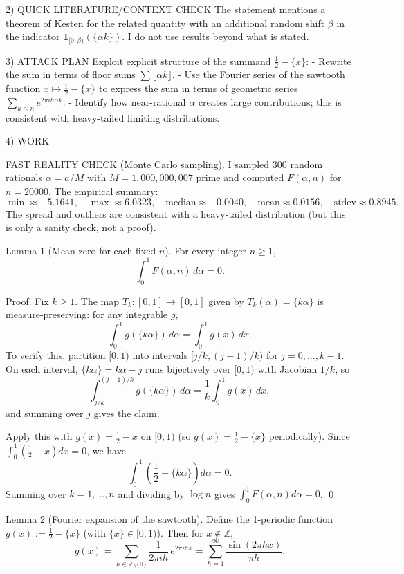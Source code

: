 2) QUICK LITERATURE/CONTEXT CHECK
The statement mentions a theorem of Kesten for the related quantity with an additional random shift $\beta$ in the indicator $\mathbf 1_{[0,\beta)}(\{\alpha k\})$.  I do not use results beyond what is stated.

3) ATTACK PLAN
Exploit explicit structure of the summand $\frac12-\{x\}$:
- Rewrite the sum in terms of floor sums $\sum\lfloor \alpha k\rfloor$.
- Use the Fourier series of the sawtooth function $x\mapsto \frac12-\{x\}$ to express the sum in terms of geometric series $\sum_{k\le n} e^{2\pi i h\alpha k}$.
- Identify how near-rational $\alpha$ creates large contributions; this is consistent with heavy-tailed limiting distributions.

4) WORK

FAST REALITY CHECK (Monte Carlo sampling).
I sampled $300$ random rationals $\alpha=a/M$ with $M=1{,}000{,}000{,}007$ prime and computed $F(\alpha,n)$ for $n=20000$.
The empirical summary:
\[
\min\approx -5.1641,\quad \max\approx 6.0323,\quad \text{median}\approx -0.0040,\quad \text{mean}\approx 0.0156,\quad \text{stdev}\approx 0.8945.
\]
The spread and outliers are consistent with a heavy-tailed distribution (but this is only a sanity check, not a proof).

Lemma 1 (Mean zero for each fixed $n$).
For every integer $n\ge 1$,
\[
\int_0^1 F(\alpha,n)\,d\alpha = 0.
\]

Proof.
Fix $k\ge 1$.  The map $T_k:[0,1]\to[0,1]$ given by $T_k(\alpha)=\{k\alpha\}$ is measure-preserving: for any integrable $g$,
\[
\int_0^1 g(\{k\alpha\})\,d\alpha = \int_0^1 g(x)\,dx.
\]
To verify this, partition $[0,1)$ into intervals $[j/k,(j+1)/k)$ for $j=0,\dots,k-1$.  On each interval, $\{k\alpha\}=k\alpha-j$ runs bijectively over $[0,1)$ with Jacobian $1/k$, so
\[
\int_{j/k}^{(j+1)/k} g(\{k\alpha\})\,d\alpha = \frac{1}{k}\int_0^1 g(x)\,dx,
\]
and summing over $j$ gives the claim.

Apply this with $g(x)=\frac12-x$ on $[0,1)$ (so $g(x)=\frac12-\{x\}$ periodically).  Since $\int_0^1 (\frac12-x)dx=0$, we have
\[
\int_0^1 \left(\frac12-\{k\alpha\}\right)d\alpha = 0.
\]
Summing over $k=1,\dots,n$ and dividing by $\log n$ gives $\int_0^1 F(\alpha,n)d\alpha=0$. \qed

Lemma 2 (Fourier expansion of the sawtooth).
Define the 1-periodic function $g(x):=\frac12-\{x\}$ (with $\{x\}\in[0,1)$).  Then for $x\notin\mathbb{Z}$,
\[
 g(x) = \sum_{h\in\mathbb{Z}\setminus\{0\}} \frac{1}{2\pi i h}\,e^{2\pi i h x}
 = \sum_{h=1}^\infty \frac{\sin(2\pi h x)}{\pi h}.
\]

